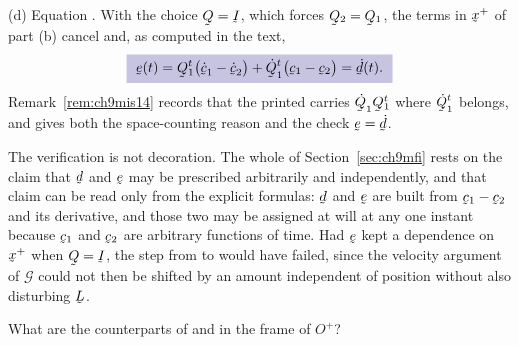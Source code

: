 \begin{solution}
(d) Equation . With the choice $\bQ=\I$, which forces
$\bQ_{2}=\bQ_{1}$, the terms in $\bx^{+}$ of part (b) cancel and, as
computed in the text,
\[
   \boxed{\ \be(t)=\bQ_{1}^{t}\big(\dot\bc_{1}-\dot\bc_{2}\big)
   +\dot\bQ_{1}^{t}\big(\bc_{1}-\bc_{2}\big)
   =\dot\bd(t).\ }
\]
Remark~\ref{rem:ch9mis14} records that the printed  carries
$\dot\bQ_{1}\bQ_{1}^{t}$ where $\dot\bQ_{1}^{t}$ belongs, and gives both
the space-counting reason and the check $\be=\dot\bd$.

The verification is not decoration. The whole of
Section~\ref{sec:ch9mfi} rests on the claim that $\bd$ and $\be$ may be
prescribed arbitrarily and independently, and that claim can be read
only from the explicit formulas: $\bd$ and $\be$ are built from
$\bc_{1}-\bc_{2}$ and its derivative, and those two may be assigned at
will at any one instant because $\bc_{1}$ and $\bc_{2}$ are arbitrary
functions of time. Had $\be$ kept a dependence on $\bx^{+}$ when
$\bQ=\I$, the step from  to  would have failed,
since the velocity argument of $\mathcal{G}$ could not then be shifted by
an amount independent of position without also disturbing $\bL$.
\end{solution}

\begin{problem}
What are the counterparts of  and  in the frame of
$O^{+}$?
\end{problem}

